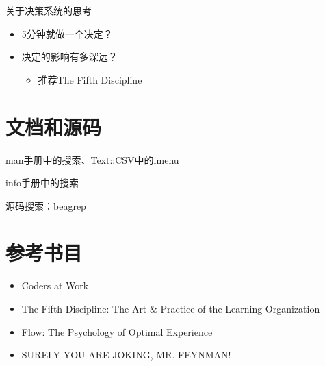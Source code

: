\documentclass[presentation,dvipdfmx,CJKbookmarks]{beamer}
\begin{document}
\begin{CJK*}{UTF8}{simsun}
\begin{frame}[label={sec:orgb0541c1}]{关于决策系统的思考}
\begin{itemize}
\item 5\thinspace 分钟就做一个决定？
\item 决定的影响有多深远？

\begin{itemize}
\item 推荐\thinspace The Fifth Discipline
\end{itemize}
\end{itemize}
\end{frame}

\section{文档和源码}
\label{sec:org6f3bf16}

\begin{frame}[label={sec:orgcd4441b}]{}
\begin{block}{man\thinspace 手册中的搜索、Text::CSV\thinspace 中的\thinspace imenu}
\end{block}
\begin{block}{info\thinspace 手册中的搜索}
\end{block}
\begin{block}{源码搜索：beagrep}
\end{block}
\end{frame}

\section{参考书目}
\label{sec:org91e8080}

\begin{frame}[label={sec:org129ec25}]{}
\begin{itemize}
\item Coders at Work
\item The Fifth Discipline: The Art \& Practice of the Learning Organization
\item Flow: The Psychology of Optimal Experience
\item SURELY YOU ARE JOKING, MR. FEYNMAN!
\end{itemize}
\end{frame}
\end{CJK*}
\end{document}
